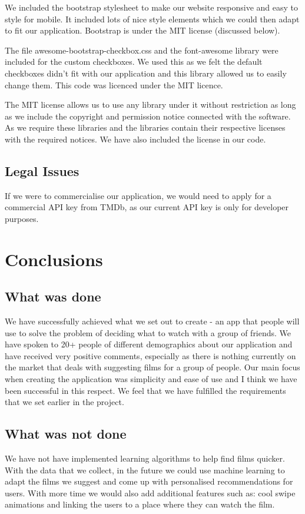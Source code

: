 \documentclass{article}
\begin{document}
We included the bootstrap stylesheet to make our website responsive and easy to style for mobile. It included lots of nice style elements which we could then adapt to fit our application.   Bootstrap is under the MIT license (discussed below).

The file awesome-bootstrap-checkbox.css and the font-awesome library were included for the custom checkboxes. We used this as we felt the default checkboxes didn’t fit with our application and this library allowed us to easily change them. This code was licenced under the MIT licence.

The MIT license allows us to use any library under it without restriction as long as we include the copyright and permission notice connected with the software. As we require these libraries and the libraries contain their respective licenses with the required notices. We have also included the license in our code. 
\subsection{Legal Issues}
If we were to commercialise our application, we would need to apply for a commercial API key from TMDb, as our current API key is only for developer purposes.
\section{Conclusions}
\subsection{What was done}
We have successfully achieved what we set out to create - an app that people will use to solve the problem of deciding what to watch with a group of friends. We have spoken to 20+ people of different demographics about our application and have received very positive comments, especially as there is nothing currently on the market that deals with suggesting films for a group of people. Our main focus when creating the application was simplicity and ease of use and I think we have been successful in this respect. We feel that we have fulfilled the requirements that we set earlier in the project.
\subsection{What was not done}
We have not have implemented learning algorithms to help find films quicker. With the data that we collect, in the future we could use machine learning to adapt the films we suggest and come up with personalised recommendations for users. With more time we would also add additional features such as: cool swipe animations and linking the users to a place where they can watch the film.
\end{document}
